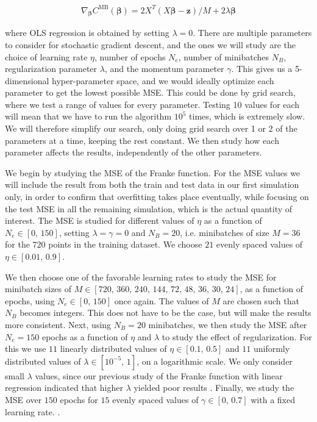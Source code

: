 \documentclass[12pt]{extarticle}
\begin{document}
\begin{align} \label{eq:SGD_gradient}
	\nabla_{\boldsymbol{\beta}}C^\mathrm{MB} (\boldsymbol{\beta})=2 X^T (X \boldsymbol{\beta} - \boldsymbol{z})/M + 2\lambda\boldsymbol{\beta}
\end{align}

where OLS regression is obtained by setting $\lambda=0$. There are multiple parameters to consider for stochastic gradient descent, and the ones we will study are the choice of learning rate $\eta$, number of epochs $N_e$, number of minibatches $N_B$, regularization parameter $\lambda$, and the momentum parameter $\gamma$. This gives us a 5-dimensional hyper-parameter space, and we would ideally optimize each parameter to get the lowest possible MSE. This could be done by grid search, where we test a range of values for every parameter. Testing 10 values for each will mean that we have to run the algorithm $10^5$ times, which is extremely slow. We will therefore simplify our search, only doing grid search over 1 or 2 of the parameters at a time, keeping the rest constant. We then study how each parameter affects the results, independently of the other parameters.


We begin by studying the MSE of the Franke function. For the MSE values we will include the result from both the train and test data in our first simulation only, in order to confirm that overfitting takes place eventually, while focusing on the test MSE in all the remaining simulation, which is the actual quantity of interest. The MSE is studied for different values of $\eta$ as a function of $N_e\in[0,\,150]$, setting $\lambda=\gamma=0$ and $N_B=20$, i.e. minibatches of size $M=36$ for the $720$ points in the training dataset. We choose $21$ evenly spaced values of $\eta\in[0.01,\,0.9]$.

We then choose one of the favorable learning rates to study the MSE for minibatch sizes of $M\in[720,\,360,\,240,\,144,\,72,\,48,\,36,\,30,\,24]$, as a function of epochs, using $N_e\in[0,\,150]$ once again. The values of $M$ are chosen such that $N_B$ becomes integers. This does not have to be the case, but will make the results more consistent. Next, using $N_B=20$ minibatches, we then study the MSE after $N_e=150$ epochs as a function of $\eta$ and $\lambda$ to study the effect of regularization. For this we use $11$ linearly distributed values of $\eta\in[0.1,\,0.5]$ and $11$ uniformly distributed values of $\lambda\in[10^{-5},\,1]$, on a logarithmic scale. We only consider small $\lambda$ values, since our previous study of the Franke function with linear regression indicated that higher $\lambda$ yielded poor results \cite{project1}. Finally, we study the MSE over $150$ epochs for $15$ evenly spaced values of $\gamma\in[0,\,0.7]$ with a fixed learning rate.
.
\end{document}
